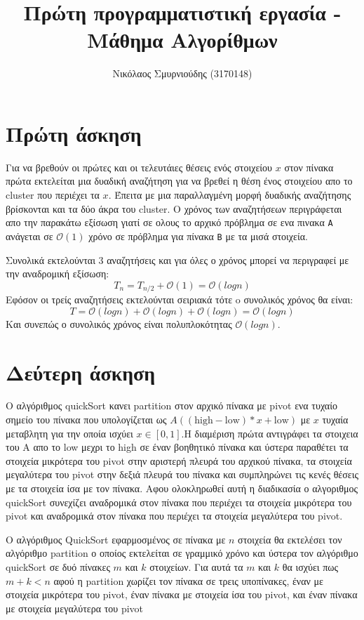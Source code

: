 \documentclass{article}
\renewcommand{\O}{\mathcal{O}}
\begin{document}
\author{Νικόλαος Σμυρνιούδης (3170148)}
\title{Πρώτη προγραμματιστική εργασία - Μάθημα Αλγορίθμων}
\maketitle
\section{Πρώτη άσκηση}
Για να βρεθούν οι πρώτες και οι τελευτάιες θέσεις ενός στοιχείου $x$ στον πίνακα πρώτα εκτελείται
μια δυαδική αναζήτηση για να βρεθεί η θέση ένος στοιχείου απο το cluster που περιέχει τα $x$. 
Έπειτα με μια παραλλαγμένη μορφή δυαδικής αναζήτησης βρίσκονται και τα δύο άκρα του cluster.
Ο χρόνος των αναζητήσεων περιγράφεται απο την παρακάτω εξίσωση γιατί σε ολους το αρχικό πρόβλημα σε ενα πινακα \texttt{A}
ανάγεται σε $\O(1)$ χρόνο σε πρόβλημα για πίνακα \texttt{B} με τα μισά στοιχεία.

Συνολικά εκτελούνται 3 αναζητήσεις και για όλες ο χρόνος μπορεί να περιγραφεί με την αναδρομική εξίσωση:
\[
T_n = T_{n/2} + \O(1) = \O(logn)	 
\]
Εφόσον οι τρείς αναζητήσεις εκτελούνται σειριακά τότε o συνολικός χρόνος θα είναι:
\[
Τ = \O(logn) + \O(logn) + \O(logn) = \O(logn)
\]
Και συνεπώς ο συνολικός χρόνος είναι πολυπλοκότητας $\O(logn)$.
\section{Δεύτερη άσκηση}

Ο αλγόριθμος quickSort κανει partition στον αρχικό πίνακα με pivot ενα τυχαίο σημείο του
πίνακα που υπολογίζεται ως $ A( (\text{high} -\text{low}) * x + \text{low} ) $ με $x$ τυχαία μεταβλητη για την οποία ισχύει 
$x \in [0,1]$.Η διαμέριση πρώτα αντιγράφει τα στοιχεια του A απο το low μεχρι το high σε έναν βοηθητικό πίνακα και ύστερα παραθέτει τα στοιχεία 
μικρότερα του pivot στην αριστερή πλευρά του αρχικού πίνακα, τα στοιχεία μεγαλύτερα του pivot στην δεξιά πλευρά του πίνακα και συμπληρώνει τις
κενές θέσεις με τα στοιχεία ίσα με τον πίνακα. Αφου ολοκληρωθεί αυτή η διαδικασία ο αλγοριθμος quickSort συνεχίζει αναδρομικά στον πίνακα που περιέχει
τα στοιχεία μικρότερα του pivot και αναδρομικά στον πίνακα που περιέχει τα στοιχεία μεγαλύτερα του pivot.

Ο αλγόριθμος QuickSort εφαρμοσμένος σε πίνακα με $n$ στοιχεία θα εκτελέσει τον αλγόριθμο partition ο οποίος εκτελείται σε γραμμικό χρόνο
και ύστερα τον αλγόριθμο quickSort σε δυό πίνακες $m$ και $k$ στοιχείων. Για αυτά τα $m$ και $k$ θα ισχύει πως $ m + k < n $ αφού η partition
χωρίζει τον πίνακα σε τρεις υποπίνακες, έναν με στοιχεία μικρότερα του pivot, έναν πίνακα με στοιχεία ίσα του pivot, και έναν πίνακα με στοιχεία μεγαλύτερα του pivot 
\end{document}
